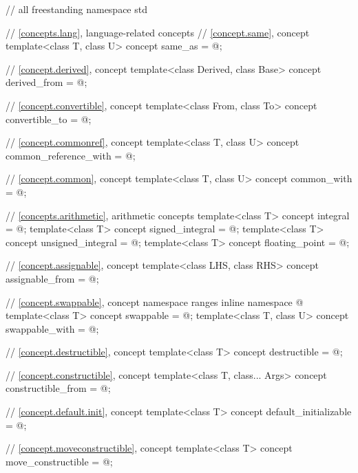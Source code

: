 %
\begin{codeblock}
// all freestanding
namespace std {
  // \ref{concepts.lang}, language-related concepts
  // \ref{concept.same}, concept 
  template<class T, class U>
    concept same_as = @\seebelow@;

  // \ref{concept.derived}, concept 
  template<class Derived, class Base>
    concept derived_from = @\seebelow@;

  // \ref{concept.convertible}, concept 
  template<class From, class To>
    concept convertible_to = @\seebelow@;

  // \ref{concept.commonref}, concept 
  template<class T, class U>
    concept common_reference_with = @\seebelow@;

  // \ref{concept.common}, concept 
  template<class T, class U>
    concept common_with = @\seebelow@;

  // \ref{concepts.arithmetic}, arithmetic concepts
  template<class T>
    concept integral = @\seebelow@;
  template<class T>
    concept signed_integral = @\seebelow@;
  template<class T>
    concept unsigned_integral = @\seebelow@;
  template<class T>
    concept floating_point = @\seebelow@;

  // \ref{concept.assignable}, concept 
  template<class LHS, class RHS>
    concept assignable_from = @\seebelow@;

  // \ref{concept.swappable}, concept 
  namespace ranges {
    inline namespace @
  }
  template<class T>
    concept swappable = @\seebelow@;
  template<class T, class U>
    concept swappable_with = @\seebelow@;

  // \ref{concept.destructible}, concept 
  template<class T>
    concept destructible = @\seebelow@;

  // \ref{concept.constructible}, concept 
  template<class T, class... Args>
    concept constructible_from = @\seebelow@;

  // \ref{concept.default.init}, concept 
  template<class T>
    concept default_initializable = @\seebelow@;

  // \ref{concept.moveconstructible}, concept 
  template<class T>
    concept move_constructible = @\seebelow@;

}
\end{codeblock}
